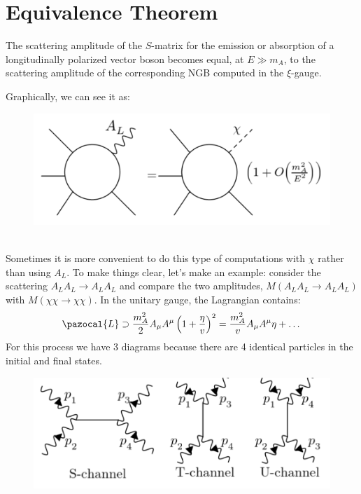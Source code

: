 \documentclass[../main.tex]{subfiles}
\begin{document}
\section{Equivalence Theorem}
\begin{theorem}
The scattering amplitude of the $S$-matrix for the emission or absorption of a longitudinally polarized vector boson becomes equal, at $E\gg m_A$, to the scattering amplitude of the corresponding NGB computed in the $\xi$-gauge.
\end{theorem}
Graphically, we can see it as:
\begin{figure}[h]
    \centering
    \includegraphics{Images/eqthm.pdf}
    \caption*{}
    \label{fig:my_label}
\end{figure}\\
Sometimes it is more convenient to do this type of computations with $\chi$ rather than using $A_L$. To make things clear, let's make an example: consider the scattering $A_LA_L\to A_LA_L$ and compare the two amplitudes, $M(A_LA_L\to A_LA_L)$ with $M(\chi\chi\to\chi\chi)$.   
In the unitary gauge, the Lagrangian contains:
\[
\pazocal{L}\supset\frac{m_A^2}{2}A_\mu A^\mu\left(1+\frac{\eta}{v}\right)^2=\frac{m_A^2}{v}A_\mu A^\mu\eta+\dots
\]
For this process we have 3 diagrams because there are 4 identical particles in the initial and final states.
\begin{figure}[h]
    \centering
    \includegraphics{Images/stu.pdf}
    \caption*{}
    \label{fig:my_label}
\end{figure}\\
\end{document}

